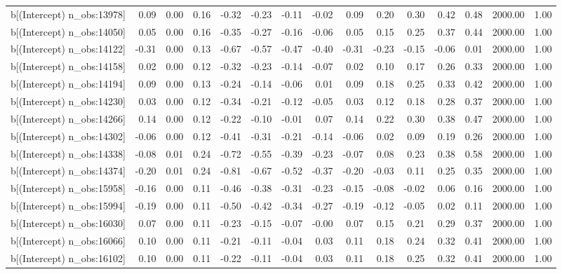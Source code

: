 \begin{table}[ht]
\begin{tabular}{rrrrrrrrrrrrrrr}
  b[(Intercept) n\_obs:13978] & 0.09 & 0.00 & 0.16 & -0.32 & -0.23 & -0.11 & -0.02 & 0.09 & 0.20 & 0.30 & 0.42 & 0.48 & 2000.00 & 1.00 \\ 
  b[(Intercept) n\_obs:14050] & 0.05 & 0.00 & 0.16 & -0.35 & -0.27 & -0.16 & -0.06 & 0.05 & 0.15 & 0.25 & 0.37 & 0.44 & 2000.00 & 1.00 \\ 
  b[(Intercept) n\_obs:14122] & -0.31 & 0.00 & 0.13 & -0.67 & -0.57 & -0.47 & -0.40 & -0.31 & -0.23 & -0.15 & -0.06 & 0.01 & 2000.00 & 1.00 \\ 
  b[(Intercept) n\_obs:14158] & 0.02 & 0.00 & 0.12 & -0.32 & -0.23 & -0.14 & -0.07 & 0.02 & 0.10 & 0.17 & 0.26 & 0.33 & 2000.00 & 1.00 \\ 
  b[(Intercept) n\_obs:14194] & 0.09 & 0.00 & 0.13 & -0.24 & -0.14 & -0.06 & 0.01 & 0.09 & 0.18 & 0.25 & 0.33 & 0.42 & 2000.00 & 1.00 \\ 
  b[(Intercept) n\_obs:14230] & 0.03 & 0.00 & 0.12 & -0.34 & -0.21 & -0.12 & -0.05 & 0.03 & 0.12 & 0.18 & 0.28 & 0.37 & 2000.00 & 1.00 \\ 
  b[(Intercept) n\_obs:14266] & 0.14 & 0.00 & 0.12 & -0.22 & -0.10 & -0.01 & 0.07 & 0.14 & 0.22 & 0.30 & 0.38 & 0.47 & 2000.00 & 1.00 \\ 
  b[(Intercept) n\_obs:14302] & -0.06 & 0.00 & 0.12 & -0.41 & -0.31 & -0.21 & -0.14 & -0.06 & 0.02 & 0.09 & 0.19 & 0.26 & 2000.00 & 1.00 \\ 
  b[(Intercept) n\_obs:14338] & -0.08 & 0.01 & 0.24 & -0.72 & -0.55 & -0.39 & -0.23 & -0.07 & 0.08 & 0.23 & 0.38 & 0.58 & 2000.00 & 1.00 \\ 
  b[(Intercept) n\_obs:14374] & -0.20 & 0.01 & 0.24 & -0.81 & -0.67 & -0.52 & -0.37 & -0.20 & -0.03 & 0.11 & 0.25 & 0.35 & 2000.00 & 1.00 \\ 
  b[(Intercept) n\_obs:15958] & -0.16 & 0.00 & 0.11 & -0.46 & -0.38 & -0.31 & -0.23 & -0.15 & -0.08 & -0.02 & 0.06 & 0.16 & 2000.00 & 1.00 \\ 
  b[(Intercept) n\_obs:15994] & -0.19 & 0.00 & 0.11 & -0.50 & -0.42 & -0.34 & -0.27 & -0.19 & -0.12 & -0.05 & 0.02 & 0.11 & 2000.00 & 1.00 \\ 
  b[(Intercept) n\_obs:16030] & 0.07 & 0.00 & 0.11 & -0.23 & -0.15 & -0.07 & -0.00 & 0.07 & 0.15 & 0.21 & 0.29 & 0.37 & 2000.00 & 1.00 \\ 
  b[(Intercept) n\_obs:16066] & 0.10 & 0.00 & 0.11 & -0.21 & -0.11 & -0.04 & 0.03 & 0.11 & 0.18 & 0.24 & 0.32 & 0.41 & 2000.00 & 1.00 \\ 
  b[(Intercept) n\_obs:16102] & 0.10 & 0.00 & 0.11 & -0.22 & -0.11 & -0.04 & 0.03 & 0.11 & 0.18 & 0.25 & 0.32 & 0.41 & 2000.00 & 1.00 \\ 

\end{tabular}
\end{table}
